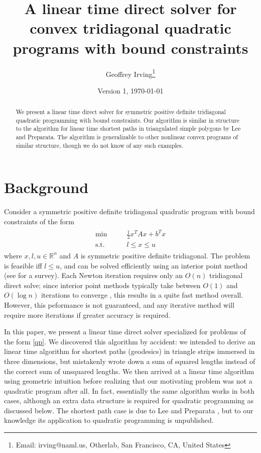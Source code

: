 \documentclass[11pt]{article}
\title{A linear time direct solver for convex tridiagonal quadratic programs with bound constraints}
\author{Geoffrey Irving\thanks{Email: irving@naml.us, Otherlab, San Francisco, CA, United States}}
\date{Version 1, \today}
\newcommand{\R}{\mathbb{R}}
\begin{document}
\maketitle

\begin{abstract}
We present a linear time direct solver for symmetric positive definite tridiagonal quadratic programming with bound constraints.  Our algorithm is similar in structure to the
algorithm for linear time shortest paths in triangulated simple polygons by Lee and Preparata.  The algorithm is generalizable to other nonlinear convex programs of similar
structure, though we do not know of any such examples.
\end{abstract}

\section{Background}

Consider a symmetric positive definite tridiagonal quadratic program with bound constraints of the form
\begin{align} \label{qp}
\begin{array}{cc}
\min          \qquad& \frac{1}{2} x^T A x + b^T x \\
\textrm{s.t.} & l \le x \le u
\end{array}
\end{align}
where $x,l,u \in \R^n$ and $A$ is symmetric positive definite tridiagonal.  The problem is feasible iff $l \le u$, and can be solved efficiently using an interior point method (see \cite{gondzio2012interior}
for a survey).  Each Newton iteration requires only an $O(n)$ tridiagonal direct solve; since interior point methods typically take between $O(1)$ and $O(\log n)$ iterations to converge \cite{colombo2008further},
this results in a quite fast method overall.  However, this peformance is not guaranteed, and any iterative method will require more iterations if greater accuracy is required.

In this paper, we present a linear time direct solver specialized for problems of the form \autoref{qp}.  We discovered this algorithm by accident: we intended to derive an linear time algorithm
for shortest paths (geodesics) in triangle strips immersed in three dimensions, but mistakenly wrote down a sum of squared lengths instead of the correct sum of unsquared lengths.  We then arrived at a linear time algorithm
using geometric intuition before realizing that our motivating problem was not a quadratic program after all.  In fact, essentially the same algorithm works in both cases, although an extra data structure is required
for quadratic programming as discussed below.  The shortest path case is due to Lee and Preparata \cite{lee1984euclidean}, but to our knowledge its application to quadratic programming is unpublished.
\end{document}
